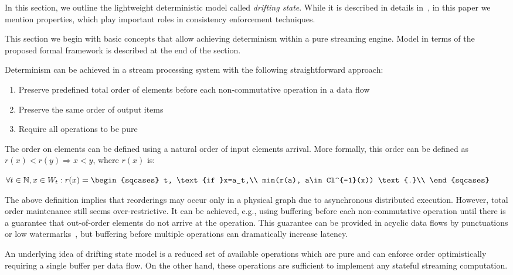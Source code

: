
\label {fs-model-section}

In this section, we outline the lightweight deterministic model called {\em drifting state}. While it is described in details in~\cite{we2018adbis}, in this paper we mention properties, which play important roles in consistency enforcement techniques.

This section we begin with basic concepts that allow achieving determinism within a pure streaming engine. Model in terms of the proposed formal framework is described at the end of the section.

Determinism can be achieved in a stream processing system with the following straightforward approach:
\begin{enumerate}
    \item Preserve predefined total order of elements before each non-commutative operation in a data flow
    \item Preserve the same order of output items
    \item Require all operations to be pure
\end{enumerate}

The order on elements can be defined using a natural order of input elements arrival. More formally, this order can be defined as $r(x) < r(y) \Rightarrow x < y$, where $r(x)$ is:

$\forall{t\in{\mathbb{N}}, x\in{W_t}} : r(x)=\begin{sqcases}
t, \text{if }x=a_t,\\
min(r(a), a\in Cl^{-1}(x)) \text{.}\\
\end{sqcases}$

The above definition implies that reorderings may occur only in a physical graph due to asynchronous distributed execution. However, total order maintenance still seems over-restrictive. It can be achieved, e.g., using buffering before each non-commutative operation until there is a guarantee that out-of-order elements do not arrive at the operation. This guarantee can be provided in acyclic data flows by punctuations or low watermarks~\cite{Li:2008:OPN:1453856.1453890}, but buffering before multiple operations can dramatically increase latency.

An underlying idea of drifting state model is a reduced set of available operations which are pure and can enforce order optimistically requiring a single buffer per data flow. On the other hand, these operations are sufficient to implement any stateful streaming computation.

